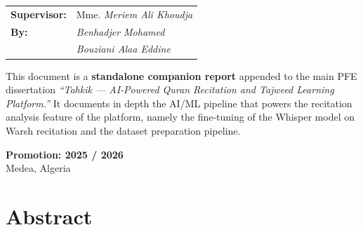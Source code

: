 \documentclass[12pt,a4paper]{report}
\begin{document}
\begin{center}
\vspace{1cm}

\begin{tabular}{ll}
  \textbf{\color{teal}Supervisor:} & Mme. \textit{Meriem Ali Khoudja} \\[10pt]
  \textbf{\color{teal}By:} & \textit{Benhadjer Mohamed} \\
  & \textit{Bouziani Alaa Eddine} \\
\end{tabular}

\vspace{0.8cm}

\begin{tcolorbox}[enhanced, colback=tealbg, colframe=teal, sharp corners,
  width=0.85\textwidth, halign=center, fontupper=\small]
This document is a \textbf{standalone companion report} appended to the main
PFE dissertation \emph{``Tahkik --- AI-Powered Quran Recitation and Tajweed
Learning Platform.''} It documents in depth the AI/ML pipeline that powers
the recitation analysis feature of the platform, namely the fine-tuning of
the Whisper model on Warsh recitation and the dataset preparation pipeline.
\end{tcolorbox}

\vfill


\vspace{0.4cm}

{\large\color{gold}\textbf{Promotion: 2025 / 2026}}\\[4pt]
{\small\color{slategray}Medea, Algeria}

\end{center}
\newpage


\chapter*{Abstract}
\end{document}
